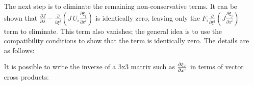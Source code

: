 The next step is to eliminate the remaining non-conservative terms. It can be shown that
${\frac{{\partial J}}{{\partial \lambda }} - \frac{\partial }{{\partial {\xi ^j}}}\left( {J\,{U_i}\frac{{\partial {\xi _j}}}{{\partial {x^i}}}} \right)}$
is identically zero\cite{Thomas1979}, leaving only the 
${F_i}\frac{\partial }{{\partial {\xi ^j}}}\left( {J\frac{{\partial {\xi _j}}}{{\partial {x^i}}}} \right)$ term to eliminate. This term also vanishes; the general idea is to use the compatibility conditions to show that the term is identically zero. The details are as follows:

It is possible to write the inverse of a 3x3 matrix such as $\frac{\partial \xi_j}{\partial x^i}$ in terms of vector cross products:

